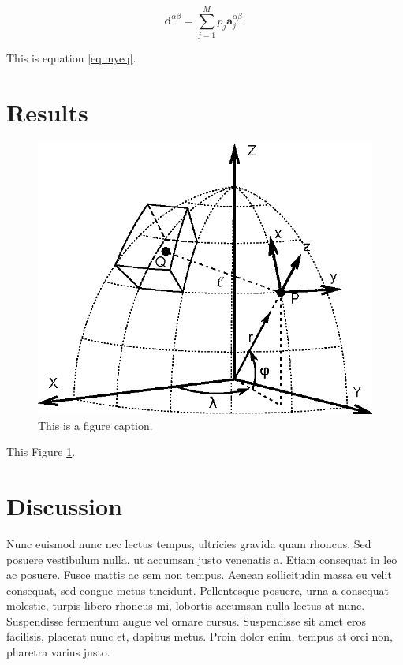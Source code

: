 \documentclass[twocolumn]{article}
\newcommand{\mbf}[1]{\mathbf{{#1}}}
\begin{document}
\begin{equation}
    \mbf{d}^{\alpha\beta} = \sum\limits_{j=1}^{M} p_j \mbf{a}_j^{\alpha\beta}.
    \label{eq:myeq}
\end{equation}

This is equation \ref{eq:myeq}.

\section{Results}

\begin{figure}
    \centering
    \includegraphics[width=\columnwidth]{figures/figure}
    \caption{This is a figure caption.}
    \label{fig:myfig}
\end{figure}

This Figure \ref{fig:myfig}.

\section{Discussion}

Nunc euismod nunc nec lectus tempus, ultricies gravida quam rhoncus. Sed
posuere vestibulum nulla, ut accumsan justo venenatis a. Etiam consequat in leo
ac posuere. Fusce mattis ac sem non tempus. Aenean sollicitudin massa eu velit
consequat, sed congue metus tincidunt. Pellentesque posuere, urna a consequat
molestie, turpis libero rhoncus mi, lobortis accumsan nulla lectus at nunc.
Suspendisse fermentum augue vel ornare cursus. Suspendisse sit amet eros
facilisis, placerat nunc et, dapibus metus. Proin dolor enim, tempus at orci
non, pharetra varius justo.
\end{document}
